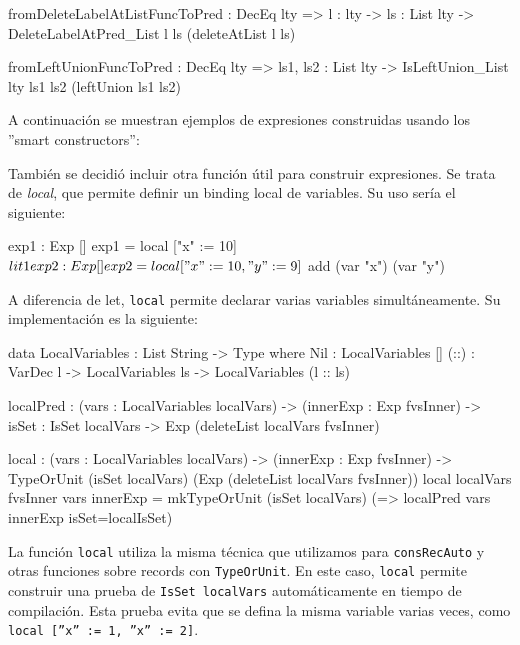 \begin{code}
fromDeleteLabelAtListFuncToPred : DecEq lty => {l : lty} ->
  {ls : List lty} -> DeleteLabelAtPred_List l ls (deleteAtList l ls)

fromLeftUnionFuncToPred : DecEq lty => {ls1, ls2 : List lty} ->
  IsLeftUnion_List {lty} ls1 ls2 (leftUnion ls1 ls2)
\end{code}

A continuación se muestran ejemplos de expresiones construidas usando los ''smart constructors'':


También se decidió incluir otra función útil para construir expresiones. Se trata de \textit{local}, que permite definir un binding local de variables. Su uso sería el siguiente:

\begin{code}
exp1 : Exp []
exp1 = local ["x" := 10] $ lit 1

exp2 : Exp []
exp2 = local ["x" := 10, "y" := 9] $ add (var "x") (var "y")
\end{code}

A diferencia de let, \texttt{local} permite declarar varias variables simultáneamente. Su implementación es la siguiente:

\begin{code}
data LocalVariables : List String -> Type where
  Nil : LocalVariables []
  (::) : VarDec l -> LocalVariables ls ->
    LocalVariables (l :: ls)

localPred : (vars : LocalVariables localVars) ->
  (innerExp : Exp fvsInner) -> {isSet : IsSet localVars} ->
  Exp (deleteList localVars fvsInner)

local : (vars : LocalVariables localVars) -> (innerExp : Exp fvsInner) ->
  TypeOrUnit (isSet localVars) (Exp (deleteList localVars fvsInner))
local {localVars} {fvsInner} vars innerExp =
  mkTypeOrUnit (isSet localVars)
    (\localIsSet => localPred vars innerExp {isSet=localIsSet})
\end{code}

La función \texttt{local} utiliza la misma técnica que utilizamos para \texttt{consRecAuto} y otras funciones sobre records con \texttt{TypeOrUnit}. En este caso, \texttt{local} permite construir una prueba de \texttt{IsSet localVars} automáticamente en tiempo de compilación. Esta prueba evita que se defina la misma variable varias veces, como \texttt{local [''x'' := 1, ''x'' := 2]}.

